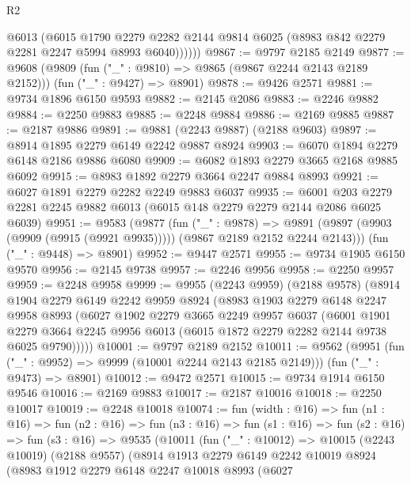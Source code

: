 \begin{lexlean}{R2}
\begin{coremodule}
            @6013
            (@6015
              @1790
              @2279
              @2282
              @2144
              @9814
              @6025
              (@8983 @842 @2279 @2281 @2247 @5994 @8993 @6040))))))
@9867 := @9797 @2185 @2149
@9877 := @9608
    (@9809 (fun ("_" : @9810) => @9865 (@9867 @2244 @2143 @2189 @2152)))
    (fun ("_" : @9427) => @8901)
@9878 := @9426 @2571
@9881 := @9734 @1896 @6150 @9593
@9882 := @2145 @2086
@9883 := @2246 @9882
@9884 := @2250 @9883
@9885 := @2248 @9884
@9886 := @2169 @9885
@9887 := @2187 @9886
@9891 := @9881 (@2243 @9887) (@2188 @9603)
@9897 := @8914 @1895 @2279 @6149 @2242 @9887 @8924
@9903 := @6070 @1894 @2279 @6148 @2186 @9886 @6080
@9909 := @6082 @1893 @2279 @3665 @2168 @9885 @6092
@9915 := @8983 @1892 @2279 @3664 @2247 @9884 @8993
@9921 := @6027 @1891 @2279 @2282 @2249 @9883 @6037
@9935 := @6001 @203 @2279 @2281 @2245 @9882 @6013 (@6015 @148 @2279 @2279 @2144 @2086 @6025 @6039)
@9951 := @9583
    (@9877
      (fun ("_" : @9878) =>
      @9891 (@9897 (@9903 (@9909 (@9915 (@9921 @9935))))) (@9867 @2189 @2152 @2244 @2143)))
    (fun ("_" : @9448) => @8901)
@9952 := @9447 @2571
@9955 := @9734 @1905 @6150 @9570
@9956 := @2145 @9738
@9957 := @2246 @9956
@9958 := @2250 @9957
@9959 := @2248 @9958
@9999 := @9955
    (@2243 @9959)
    (@2188 @9578)
    (@8914
      @1904
      @2279
      @6149
      @2242
      @9959
      @8924
      (@8983
        @1903
        @2279
        @6148
        @2247
        @9958
        @8993
        (@6027
          @1902
          @2279
          @3665
          @2249
          @9957
          @6037
          (@6001
            @1901
            @2279
            @3664
            @2245
            @9956
            @6013
            (@6015 @1872 @2279 @2282 @2144 @9738 @6025 @9790)))))
@10001 := @9797 @2189 @2152
@10011 := @9562
    (@9951 (fun ("_" : @9952) => @9999 (@10001 @2244 @2143 @2185 @2149)))
    (fun ("_" : @9473) => @8901)
@10012 := @9472 @2571
@10015 := @9734 @1914 @6150 @9546
@10016 := @2169 @9883
@10017 := @2187 @10016
@10018 := @2250 @10017
@10019 := @2248 @10018
@10074 := fun (width : @16) =>
  fun (n1 : @16) =>
  fun (n2 : @16) =>
  fun (n3 : @16) =>
  fun (s1 : @16) =>
  fun (s2 : @16) =>
  fun (s3 : @16) =>
  @9535
    (@10011
      (fun ("_" : @10012) =>
      @10015
        (@2243 @10019)
        (@2188 @9557)
        (@8914
          @1913
          @2279
          @6149
          @2242
          @10019
          @8924
          (@8983
            @1912
            @2279
            @6148
            @2247
            @10018
            @8993
            (@6027

\end{coremodule}
\end{lexlean}
